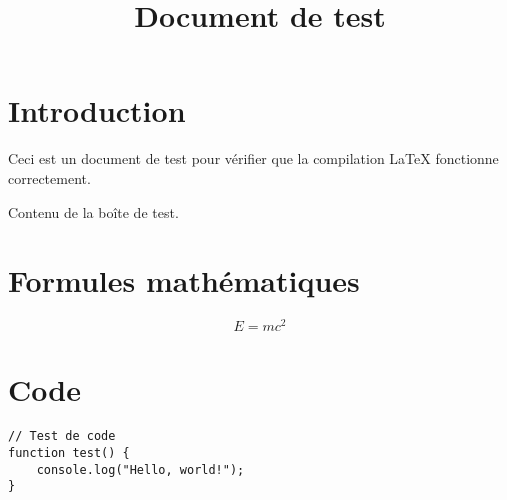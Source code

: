 \documentclass[12pt]{article}
\title{Document de test}
\author{}
\date{}
\begin{document}
\maketitle

\section{Introduction}
Ceci est un document de test pour vérifier que la compilation LaTeX fonctionne correctement.

\begin{tcolorbox}[title={Test de boîte}]
Contenu de la boîte de test.
\end{tcolorbox}

\section{Formules mathématiques}
\begin{equation}
E = mc^2
\end{equation}

\section{Code}
\begin{lstlisting}
// Test de code
function test() {
    console.log("Hello, world!");
}
\end{lstlisting}
\end{document}
